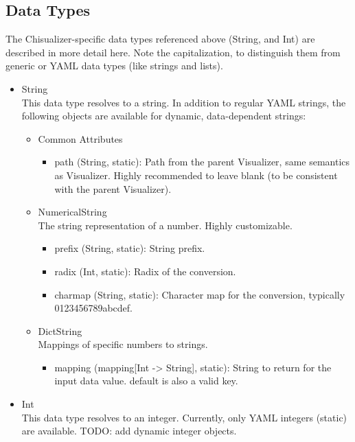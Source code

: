 \documentclass[11pt]{article}
\begin{document}
\subsection {Data Types}
The Chisualizer-specific data types referenced above (String, and Int) are described in more detail here. Note the capitalization, to distinguish them from generic or YAML data types (like strings and lists).
\begin{itemize}
  \item String \\
  This data type resolves to a string. In addition to regular YAML strings, the following objects are available for dynamic, data-dependent strings:
  \begin{itemize}
    \item Common Attributes \\
    \begin{itemize}
      \item path (String, static): Path from the parent Visualizer, same semantics as Visualizer. Highly recommended to leave blank (to be consistent with the parent Visualizer).
    \end{itemize}    
    \item NumericalString \\
    The string representation of a number. Highly customizable.
    \begin{itemize}
      \item prefix (String, static): String prefix.
      \item radix (Int, static): Radix of the conversion.
      \item charmap (String, static): Character map for the conversion, typically 0123456789abcdef.
    \end{itemize}
    \item DictString \\
    Mappings of specific numbers to strings.
    \begin{itemize}
      \item mapping (mapping[Int -> String], static): String to return for the input data value. default is also a valid key.
    \end{itemize}
  \end{itemize}
  \item Int \\
  This data type resolves to an integer. Currently, only YAML integers (static) are available. TODO: add dynamic integer objects.
\end{itemize}
\end{document}
